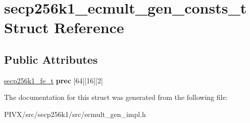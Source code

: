 \hypertarget{structsecp256k1__ecmult__gen__consts__t}{}\section{secp256k1\+\_\+ecmult\+\_\+gen\+\_\+consts\+\_\+t Struct Reference}
\label{structsecp256k1__ecmult__gen__consts__t}
\subsection*{Public Attributes}
\begin{DoxyCompactItemize}
\item 
\mbox{\label{structsecp256k1__ecmult__gen__consts__t_a38fa81fa38cafc25a77af91c7c904dc9}} 
\mbox{\hyperlink{structsecp256k1__fe__t}{secp256k1\+\_\+fe\+\_\+t}} {\bfseries prec} \mbox{[}64\mbox{]}\mbox{[}16\mbox{]}\mbox{[}2\mbox{]}
\end{DoxyCompactItemize}


The documentation for this struct was generated from the following file\+:\begin{DoxyCompactItemize}
\item 
P\+I\+V\+X/src/secp256k1/src/ecmult\+\_\+gen\+\_\+impl.\+h\end{DoxyCompactItemize}
